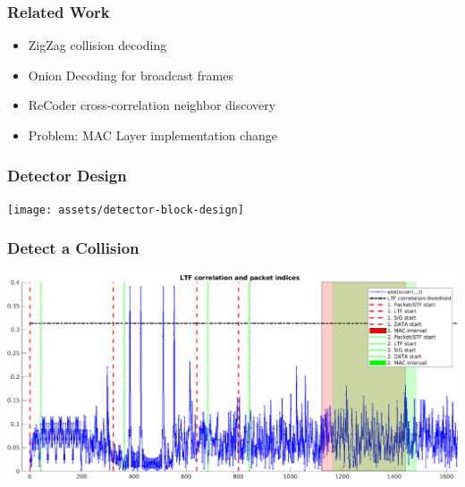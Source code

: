 \documentclass[accentcolor=tud8b,colorbacktitle]{tudbeamer}
\begin{document}
\begin{frame}
\frametitle{Related Work}
\begin{itemize}
	\setlength\itemsep{1em}
	\item ZigZag \cite{gollakota2008} collision decoding
	\item Onion Decoding \cite{wang2010} for broadcast frames
	\item ReCoder \cite{meng2015} cross-correlation neighbor discovery
	\vspace{0.2cm}
	\item Problem: MAC Layer implementation change
\end{itemize}
\end{frame}


\begin{frame}
\frametitle{Detector Design}
\begin{centering}
	\vspace{0.7cm}
	\texttt{[image: assets/detector-block-design]}\\
\end{centering}
\end{frame}


\begin{frame}
\frametitle{Detect a Collision}
\begin{centering}
	\includegraphics[width=\textwidth]{assets/preamble}\\
\end{centering}
\end{frame}
\end{document}
